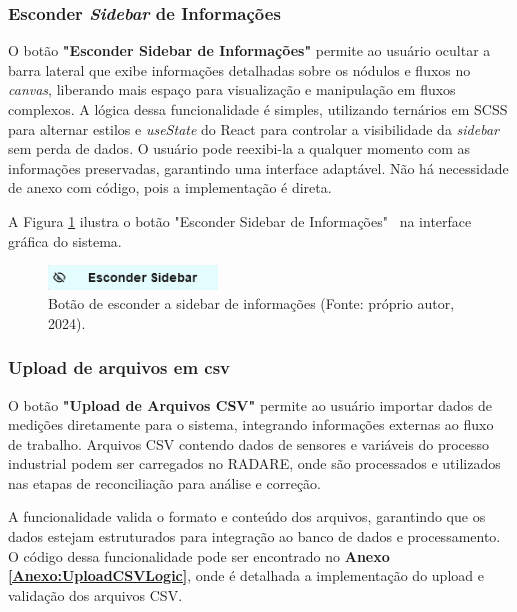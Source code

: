 \subsubsection{Esconder \textit{Sidebar} de Informações}

O botão \textbf{"Esconder Sidebar de Informações"} permite ao usuário ocultar a barra lateral que exibe informações detalhadas sobre os nódulos e fluxos no \textit{canvas}, liberando mais espaço para visualização e manipulação em fluxos complexos. A lógica dessa funcionalidade é simples, utilizando ternários em SCSS para alternar estilos e \textit{useState} do React para controlar a visibilidade da \textit{sidebar} sem perda de dados. O usuário pode reexibi-la a qualquer momento com as informações preservadas, garantindo uma interface adaptável. Não há necessidade de anexo com código, pois a implementação é direta.

A Figura \ref{Fig:HideSidebarButton} ilustra o botão "Esconder Sidebar de Informações" \ na interface gráfica do sistema.

\begin{figure}[htbp]
    \centering
    \includegraphics[width=0.4\textwidth]{figuras/hide-sidebar-button.png}
    \caption{Botão de esconder a sidebar de informações (Fonte: próprio autor, 2024).}
    \label{Fig:HideSidebarButton}
\end{figure}

\subsubsection{Upload de arquivos em csv}

O botão \textbf{"Upload de Arquivos CSV"} permite ao usuário importar dados de medições diretamente para o sistema, integrando informações externas ao fluxo de trabalho. Arquivos CSV contendo dados de sensores e variáveis do processo industrial podem ser carregados no RADARE, onde são processados e utilizados nas etapas de reconciliação para análise e correção.

A funcionalidade valida o formato e conteúdo dos arquivos, garantindo que os dados estejam estruturados para integração ao banco de dados e processamento. O código dessa funcionalidade pode ser encontrado no \textbf{Anexo \ref{Anexo:UploadCSVLogic}}, onde é detalhada a implementação do upload e validação dos arquivos CSV.

